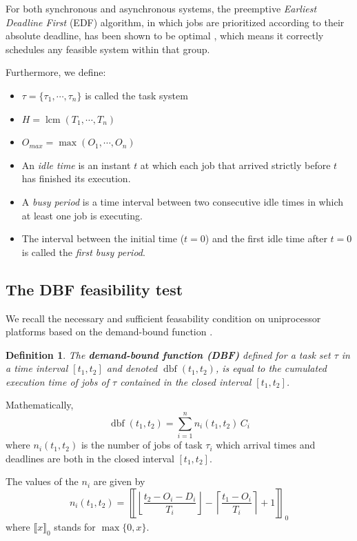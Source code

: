 \documentclass[conference]{IEEEtran}
\newtheorem{definition}{Definition}
\newcommand{\dbf}[1]{\operatorname{dbf}(#1)}
\begin{document}
		For both synchronous and asynchronous systems, the preemptive
		\emph{Earliest Deadline First} (EDF) algorithm, in which jobs are prioritized according to their absolute deadline, has been
		shown to be optimal \cite{liu1973scheduling}, which means it
		correctly schedules any feasible system within that group.

		Furthermore, we define:
		\begin{itemize}
			\item $\tau = \{\tau_1, \cdots, \tau_{n}\}$ is called the task system
			\item $H = \operatorname{lcm}(T_1, \cdots, T_{n})$
			\item $O_{max} = \max (O_1, \cdots, O_{n})$
			\item An \emph{idle time} is an instant $t$ at which each job that arrived
			strictly before $t$ has finished its execution.
			\item A \emph{busy period} is a time interval between two consecutive idle times in
			which at least one job is executing.
			\item The interval between the initial time ($t=0$) and the first
			idle time after $t=0$ is called the \emph{first busy period}.
		\end{itemize}

	\subsection{The DBF feasibility test}
		We recall the necessary and sufficient feasability condition on uniprocessor
		platforms based on the demand-bound function \cite{baruah1999generalized,
		baruah1990algorithms}.

		\begin{definition}
			The \textbf{demand-bound function (DBF)}
			defined for a task set $\tau$ in a time interval $[t_1, t_2]$ and denoted $\dbf{t_1, t_2}$, is
			equal to the cumulated execution time of jobs of $\tau$ contained in the
			closed interval $[t_1, t_2]$.
		\end{definition}

		Mathematically,
		\begin{equation}
			\dbf{t_1, t_2} = \sum_{i=1}^{n} n_i(t_1, t_2) \, C_i
		\end{equation}
		where $n_i(t_1, t_2)$ is the number of jobs of task $\tau_i$ which arrival times
		and deadlines are both in the closed interval $[t_1, t_2]$.

		The values of the $n_i$ are given by \cite{baruah1990algorithms}
		\begin{equation}
			n_i(t_1, t_2) =
			\left\llbracket
				\left\lfloor
					\frac{t_2 - O_i - D_i}{T_i}
				\right\rfloor -
				\left\lceil
					\frac{t_1 - O_i}{T_i}
				\right\rceil + 1
			\right\rrbracket_0
		\end{equation}
		where $\llbracket x \rrbracket_0$ stands for $\max \{ 0, x \}$.
\end{document}
